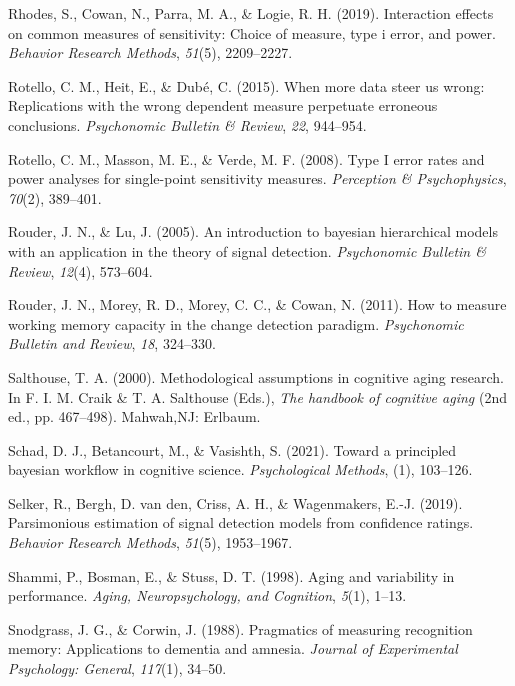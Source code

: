 \documentclass[
  english,
  ,man,floatsintext]{apa6}
\begin{document}
\leavevmode\hypertarget{ref-rhodes2019interaction}{}%
Rhodes, S., Cowan, N., Parra, M. A., \& Logie, R. H. (2019). Interaction effects on common measures of sensitivity: Choice of measure, type i error, and power. \emph{Behavior Research Methods}, \emph{51}(5), 2209--2227.

\leavevmode\hypertarget{ref-RotelloEtAl2015}{}%
Rotello, C. M., Heit, E., \& Dubé, C. (2015). When more data steer us wrong: Replications with the wrong dependent measure perpetuate erroneous conclusions. \emph{Psychonomic Bulletin \& Review}, \emph{22}, 944--954.

\leavevmode\hypertarget{ref-RotelloEtAl2008}{}%
Rotello, C. M., Masson, M. E., \& Verde, M. F. (2008). Type I error rates and power analyses for single-point sensitivity measures. \emph{Perception \& Psychophysics}, \emph{70}(2), 389--401.

\leavevmode\hypertarget{ref-rouder2005introduction}{}%
Rouder, J. N., \& Lu, J. (2005). An introduction to bayesian hierarchical models with an application in the theory of signal detection. \emph{Psychonomic Bulletin \& Review}, \emph{12}(4), 573--604.

\leavevmode\hypertarget{ref-RouderEtAl2011}{}%
Rouder, J. N., Morey, R. D., Morey, C. C., \& Cowan, N. (2011). How to measure working memory capacity in the change detection paradigm. \emph{Psychonomic Bulletin and Review}, \emph{18}, 324--330.

\leavevmode\hypertarget{ref-Salthouse2000}{}%
Salthouse, T. A. (2000). Methodological assumptions in cognitive aging research. In F. I. M. Craik \& T. A. Salthouse (Eds.), \emph{The handbook of cognitive aging} (2nd ed., pp. 467--498). Mahwah,NJ: Erlbaum.

\leavevmode\hypertarget{ref-schad2021toward}{}%
Schad, D. J., Betancourt, M., \& Vasishth, S. (2021). Toward a principled bayesian workflow in cognitive science. \emph{Psychological Methods}, (1), 103--126.

\leavevmode\hypertarget{ref-selker2019parsimonious}{}%
Selker, R., Bergh, D. van den, Criss, A. H., \& Wagenmakers, E.-J. (2019). Parsimonious estimation of signal detection models from confidence ratings. \emph{Behavior Research Methods}, \emph{51}(5), 1953--1967.

\leavevmode\hypertarget{ref-shammi1998aging}{}%
Shammi, P., Bosman, E., \& Stuss, D. T. (1998). Aging and variability in performance. \emph{Aging, Neuropsychology, and Cognition}, \emph{5}(1), 1--13.

\leavevmode\hypertarget{ref-SnodgrassAndCorwin1988}{}%
Snodgrass, J. G., \& Corwin, J. (1988). Pragmatics of measuring recognition memory: Applications to dementia and amnesia. \emph{Journal of Experimental Psychology: General}, \emph{117}(1), 34--50.
\end{document}
